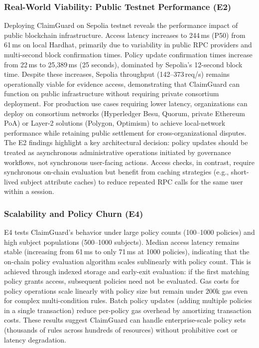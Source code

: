 \documentclass[final,5p,times,twocolumn]{elsarticle}
\begin{document}
\subsubsection{Real-World Viability: Public Testnet Performance (E2)}

Deploying ClaimGuard on Sepolia testnet reveals the performance impact of public blockchain infrastructure. Access latency increases to 244\,ms (P50) from 61\,ms on local Hardhat, primarily due to variability in public RPC providers and multi-second block confirmation times. Policy update confirmation times increase from 22\,ms to 25,389\,ms (25 seconds), dominated by Sepolia's 12-second block time. Despite these increases, Sepolia throughput (142--373\,req/s) remains operationally viable for evidence access, demonstrating that ClaimGuard can function on public infrastructure without requiring private consortium deployment. For production use cases requiring lower latency, organizations can deploy on consortium networks (Hyperledger Besu, Quorum, private Ethereum PoA) or Layer-2 solutions (Polygon, Optimism) to achieve local-network performance while retaining public settlement for cross-organizational disputes. The E2 findings highlight a key architectural decision: policy updates should be treated as asynchronous administrative operations initiated by governance workflows, not synchronous user-facing actions. Access checks, in contrast, require synchronous on-chain evaluation but benefit from caching strategies (e.g., short-lived subject attribute caches) to reduce repeated RPC calls for the same user within a session.

\subsubsection{Scalability and Policy Churn (E4)}

E4 tests ClaimGuard's behavior under large policy counts (100--1000 policies) and high subject populations (500--1000 subjects). Median access latency remains stable (increasing from 61\,ms to only 71\,ms at 1000 policies), indicating that the on-chain policy evaluation algorithm scales sublinearly with policy count. This is achieved through indexed storage and early-exit evaluation: if the first matching policy grants access, subsequent policies need not be evaluated. Gas costs for policy operations scale linearly with policy size but remain under 200k gas even for complex multi-condition rules. Batch policy updates (adding multiple policies in a single transaction) reduce per-policy gas overhead by amortizing transaction costs. These results suggest ClaimGuard can handle enterprise-scale policy sets (thousands of rules across hundreds of resources) without prohibitive cost or latency degradation.
\end{document}
